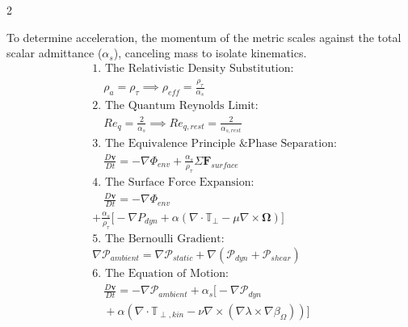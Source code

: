 \begin{multicols}{2}
\begin{tcolorbox}[cheatbox, title={\refstepcounter{cheatnum}\label{box:admittance_ns}\thecheatnum. Compliance-Modified Navier-Stokes \scriptsize\hfill\hyperref[sec:deriv_admittance_ns]{[Proof $\downarrow$]}}]
To determine acceleration, the momentum of the metric scales against the total scalar admittance ($\alpha_s$), canceling mass to isolate kinematics. %
\begin{align}
    &\text{1. The Relativistic Density Substitution:} \nonumber \\
    &\quad \rho_a = \rho_\tau \implies \rho_{eff} = \frac{\rho_\tau}{\alpha_s} \label{eq:ns_density_substitution} \\ %
    &\text{2. The Quantum Reynolds Limit:} \nonumber \\
    &\quad Re_q = \frac{2}{\alpha_s} \implies Re_{q,rest} = \frac{2}{\alpha_{s,rest}} \label{eq:quantum_reynolds} \\ %
    &\text{3. The Equivalence Principle \& Phase Separation:} \nonumber \\
    &\quad \frac{D\mathbf{v}}{Dt} = -\nabla \Phi_{env} + \frac{\alpha_s}{\rho_\tau} \Sigma \mathbf{F}_{surface} \label{eq:admittance_ns} \\ %
    &\text{4. The Surface Force Expansion:} \nonumber \\
    &\quad \frac{D\mathbf{v}}{Dt} = -\nabla \Phi_{env} \nonumber \\ & + \frac{\alpha_s}{\rho_\tau} \Big[ -\nabla P_{dyn} + \alpha(\nabla \cdot \mathbb{T}_{\perp} - \mu \nabla \times \boldsymbol{\Omega}) \Big] \label{eq:propulsion_master} \\ %
    &\text{5. The Bernoulli Gradient:} \nonumber \\ %
    & \nabla \mathcal{P}_{ambient} = \nabla \mathcal{P}_{static} + \nabla(\mathcal{P}_{dyn} + \mathcal{P}_{shear}) \label{eq:bernoulli_gradient} \\
    &\text{6. The Equation of Motion:} \nonumber \\
    &\quad \frac{D\mathbf{v}}{Dt} = -\nabla \mathcal{P}_{ambient} + \alpha_s \Big[ -\nabla \mathcal{P}_{dyn}  \nonumber \\ &\quad + \alpha(\nabla \cdot \mathbb{T}_{\perp, kin} - \nu \nabla \times (\nabla\lambda \times \nabla\beta_\Omega)) \Big] \label{eq:kinematic_ns} 
\end{align}
\end{tcolorbox}


\end{multicols}
